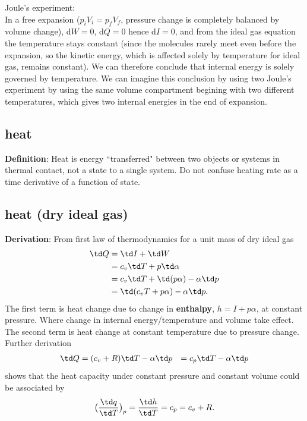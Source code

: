{Joule's experiment:} \\
In a free expansion ($p_iV_i = p_fV_f$, pressure change is completely balanced by volume change),
d$W = 0$, d$Q = 0$ hence d$I = 0$, and from the ideal gas equation the temperature stays constant
(since the molecules rarely meet even before the expansion, so the kinetic energy, which is affected
solely by temperature for ideal gas, remains constant). We can therefore conclude that internal
energy is solely governed by temperature. We can imagine this conclusion by using two Joule's
experiment by using the same volume compartment begining with two different temperatures, which
gives two internal energies in the end of expansion. 


\subsection{heat}
{\bf{Definition}}: Heat is energy ``transferred" between two objects or systems in thermal contact, not
a state to a single system. Do not confuse heating rate as a time derivative of a function of state.


\subsection{heat (dry ideal gas)}
{\bf{Derivation}}: From first law of thermodynamics for a unit mass of dry ideal gas
\begin{equation} \label{eq:energy_cv}
\begin{aligned}
  \td Q & = \td I + \td W \\
        & = c_v \td T + p \td \alpha \\
        & = c_v \td T + \td(p\alpha) - \alpha \td p \\
        & = \td (c_v T + p\alpha) - \alpha \td p. 
\end{aligned}
\end{equation}
The first term is heat change due to change in {\bf{enthalpy}}, $h = I + p\alpha$, at constant
pressure. Where change in internal energy/temperature and volume take effect. The second
term is heat change at constant temperature due to pressure change. Further derivation 
\begin{equation} \label{eq:energy_cp}
\begin{aligned}
  \td Q & = (c_v + R) \td T - \alpha \td p
        & = c_p \td T - \alpha \td p
\end{aligned}
\end{equation}
shows that the heat capacity under constant pressure and constant volume could be associated by
\begin{equation}
  \big( \frac{\td q}{\td T} \big)_p = \frac{\td h}{\td T} =  c_p = c_v + R.
\end{equation}

